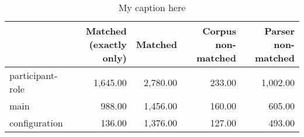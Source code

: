 \begin{table}[!ht]
\centering
\begin{tabular}{lrrrr}
\toprule
{} &  Matched (exactly only) &  Matched &  Corpus non-matched &  Parser non-matched \\
\midrule
participant-role &                1,645.00 & 2,780.00 &              233.00 &            1,002.00 \\
main             &                  988.00 & 1,456.00 &              160.00 &              605.00 \\
configuration    &                  136.00 & 1,376.00 &              127.00 &              493.00 \\
\bottomrule
\end{tabular}
\caption{My caption here}
\label{tab:unit-elements-transitivity-data}
\end{table}